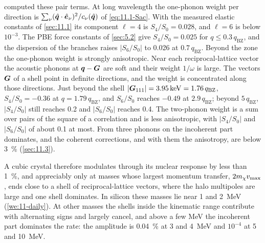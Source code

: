  computed these pair terms. At long wavelength the one-phonon weight per direction is $\sum_\nu(\hat{\bm{q}}\cdot\hat{\bm{e}}_\nu)^2/c_\nu(\hat{\bm{q}})$ of \cref{eq:11.1-Sac}. With the measured elastic constants of \cref{sec:11.1} its component $\ell = 4$ is $S_4/S_0 = 0.028$, and $\ell = 6$ is below $10^{-3}$. The PBE force constants of \cref{sec:5.2} give $S_4/S_0 = 0.025$ for $q \le 0.3\,q_{\mathrm{BZ}}$, and the dispersion of the branches raises $|S_6/S_0|$ to 0.026 at $0.7\,q_{\mathrm{BZ}}$. Beyond the zone the one-phonon weight is strongly anisotropic. Near each reciprocal-lattice vector the acoustic phonons at $\bm{q} - \bm{G}$ are soft and their weight $1/\omega$ is large. The vectors $\bm{G}$ of a shell point in definite directions, and the weight is concentrated along those directions. Just beyond the shell $|\bm{G}_{111}| = \SI{3.95}{keV} = 1.76\,q_{\mathrm{BZ}}$, $S_4/S_0 = -0.36$ at $q = 1.79\,q_{\mathrm{BZ}}$, and $S_6/S_0$ reaches $-0.49$ at $2.9\,q_{\mathrm{BZ}}$; beyond $5\,q_{\mathrm{BZ}}$, $|S_4/S_0|$ still reaches 0.2 and $|S_6/S_0|$ reaches 0.4. The two-phonon weight is a sum over pairs of the square of a correlation and is less anisotropic, with $|S_4/S_0|$ and $|S_6/S_0|$ of about 0.1 at most. From three phonons on the incoherent part dominates, and the coherent corrections, and with them the anisotropy, are below \SI{3}{\percent} (\cref{sec:11.3}).

A cubic crystal therefore modulates through its nuclear response by less than \SI{1}{\percent}, and appreciably only at masses whose largest momentum transfer, $2m_{\chi} v_{\mathrm{max}}$, ends close to a shell of reciprocal-lattice vectors, where the halo multipoles are large and one shell dominates. In silicon these masses lie near 1 and \SI{2}{MeV} (\cref{we:11-daily}). At other masses the shells inside the kinematic range contribute with alternating signs and largely cancel, and above a few MeV the incoherent part dominates the rate: the amplitude is \SI{0.04}{\percent} at 3 and \SI{4}{MeV} and $10^{-4}$ at 5 and \SI{10}{MeV}.

